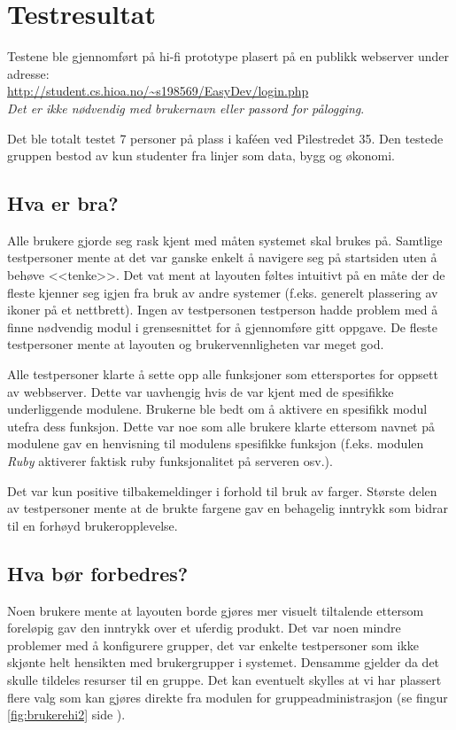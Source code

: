 \section{Testresultat}
Testene ble gjennomført på hi-fi prototype plasert på en publikk webserver under adresse:\\ \url{http://student.cs.hioa.no/~s198569/EasyDev/login.php}\\
\textit{Det er ikke nødvendig med brukernavn eller passord for pålogging}.

Det ble totalt testet 7 personer på plass i kaféen ved Pilestredet 35. 
Den testede gruppen bestod av kun studenter fra linjer som data, bygg og økonomi.

\subsection{Hva er bra?}
Alle brukere gjorde seg rask kjent med måten systemet skal brukes på.
Samtlige testpersoner mente at det var ganske enkelt å navigere seg på startsiden uten å behøve <<tenke>>. 
Det vat ment at layouten føltes intuitivt på en måte der de fleste kjenner seg igjen fra bruk av andre systemer (f.eks. generelt plassering av ikoner på et nettbrett). 
Ingen av testpersonen testperson hadde problem med å finne nødvendig modul i grensesnittet for å gjennomføre gitt oppgave.
De fleste testpersoner mente at layouten og brukervennligheten var meget god.

Alle testpersoner klarte å sette opp alle funksjoner som ettersportes for oppsett av webbserver. 
Dette var uavhengig hvis de var kjent med de spesifikke underliggende modulene. 
Brukerne ble bedt om å aktivere en spesifikk modul utefra dess funksjon.
Dette var noe som alle brukere klarte ettersom navnet på modulene gav en henvisning til modulens spesifikke funksjon (f.eks. modulen \textit{Ruby} aktiverer faktisk ruby funksjonalitet på serveren osv.).

Det var kun positive tilbakemeldinger i forhold til bruk av farger. 
Største delen av testpersoner mente at de brukte fargene gav en behagelig inntrykk som bidrar til en forhøyd brukeropplevelse.

\subsection{Hva bør forbedres?}
Noen brukere mente at layouten borde gjøres mer visuelt tiltalende ettersom foreløpig gav den inntrykk over et uferdig produkt.
Det var noen mindre problemer med å konfigurere grupper, det var enkelte testpersoner som ikke skjønte helt hensikten med brukergrupper i systemet. 
Densamme gjelder da det skulle tildeles resurser til en gruppe. Det kan eventuelt skylles at vi har plassert flere valg som kan gjøres direkte fra modulen for gruppeadministrasjon (se fingur \ref{fig:brukerehi2} side \pageref{fig:brukerehi2}).

